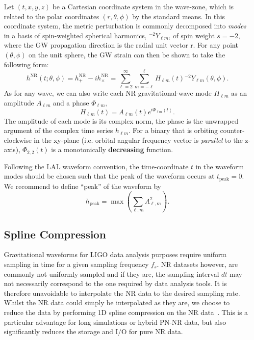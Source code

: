 \documentclass[11pt,tightenlines,article,amssymb,amsmath,amsfonts,superscriptaddress]{revtex4}
\begin{document}
Let $(t,x,y,z)$ be a Cartesian coordinate system in the wave-zone, which is related to the polar coordinates $(r, \theta, \phi)$ by the standard means. In this coordinate system, the metric perturbation is commonly decomposed into \emph{modes}
in a basis of spin-weighted spherical harmonics, ${}^{-2}Y_{\ell m}$, of spin weight $s=-2$, where the GW propagation direction is
the radial unit vector r.
For any point $(\theta, \phi)$ on the unit sphere, the GW strain can then be shown to take the following form:
\begin{equation}
\label{ }
h^\mathrm{NR}(t; \theta, \phi) = h^\mathrm{NR}_+ - i h^\mathrm{NR}_\times = \sum_{\ell=2}^\infty \sum_{m=-\ell}^{\ell} H_{\ell m}(t) {}^{-2}Y_{\ell m}(\theta,\phi).
\end{equation}
As for any wave, we can also write each NR gravitational-wave mode $H_{\ell m}$ as an amplitude $A_{\ell m}$ and a phase
$\Phi_{\ell m}$,
\begin{equation}
\label{ }
H_{\ell m}(t) = A_{\ell m}(t)e^{i\Phi_{\ell m}(t)}.
\end{equation}
The amplitude of each mode is its complex norm, the phase is the unwrapped argument of the complex time series $h_{\ell m}$. For a binary that is orbiting counter-clockwise in the xy-plane (i.e. orbital angular frequency vector is \emph{parallel} to the z-axis), $\Phi_{2,2}(t)$ is a monotonically {\bf decreasing} function.

Following the LAL waveform convention, the time-coordinate $t$ in the waveform modes should be chosen such that the peak of the waveform occurs at $t_\mathrm{peak}=0$. We recommend to define ``peak'' of the waveform by 
\begin{equation}
\label{eq:peak}
h_\mathrm{peak} = \max \left( \sum_{\ell, m} A_{\ell, m}^2 \right).
\end{equation}
\subsection{Spline Compression}
\label{sec:spline}
Gravitational waveforms for LIGO data analysis purposes require uniform sampling in time for a given sampling frequency $f_s$.
NR datasets however, are commonly not uniformly sampled and if they are, the sampling interval $dt$ may not necessarily
correspond to the one required by data analysis tools. 
It is therefore unavoidable to interpolate the NR data to the desired sampling rate. Whilst the NR data could simply be interpolated as
they are, we choose to reduce the data by performing 1D spline compression on the NR data~\cite{Galley:2016aa}. This is a particular advantage for long simulations or hybrid PN-NR data, but also significantly reduces the storage and I/O for pure NR data. \\
\end{document}
